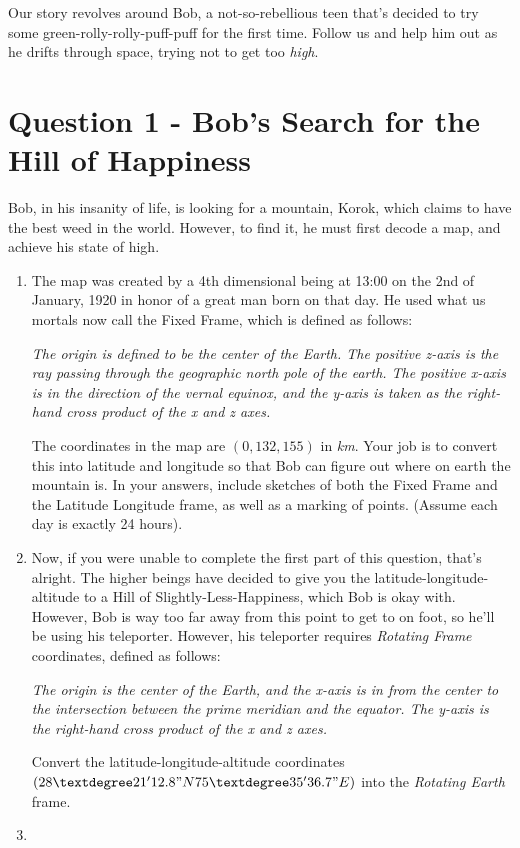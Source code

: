 \documentclass[a4paper, 12pt]{exam}
\begin{document}
	Our story revolves around Bob, a not-so-rebellious teen that's decided to try some green-rolly-rolly-puff-puff for the first time. Follow us and help him out as he drifts through space, trying not to get too \textit{high}.
	
	\pagebreak
	

	\section*{Question 1 - Bob's Search for the Hill of Happiness}
	Bob, in his insanity of life, is looking for a mountain, Korok, which claims to have the best weed in the world. However, to find it, he must first decode a map, and achieve his state of high.
	
	\begin{enumerate}[label=(\alph*)]
		\item The map was created by a 4th dimensional being at 13:00 on the 2nd of January, 1920 in honor of a great man born on that day. He used what us mortals now call the Fixed Frame, which is defined as follows:
		\begin{center}
			\textit{The origin is defined to be the center of the Earth. The positive z-axis is the ray passing through the geographic north pole of the earth. The positive x-axis is in the direction of the vernal equinox, and the y-axis is taken as the right-hand cross product of the x and z axes.}
		\end{center}
		The coordinates in the map are $(0,132,155)$ in \textit{km}. Your job is to convert this into latitude and longitude so that Bob can figure out where on earth the mountain is. In your answers, include sketches of both the Fixed Frame and the Latitude Longitude frame, as well as a marking of points. (Assume each day is exactly 24 hours).
		
		\item Now, if you were unable to complete the first part of this question, that's alright. The higher beings have decided to give you the latitude-longitude-altitude to a Hill of Slightly-Less-Happiness, which Bob is okay with. However, Bob is way too far away from this point to get to on foot, so he'll be using his teleporter. However, his teleporter requires \textit{Rotating Frame} coordinates, defined as follows:
		\begin{center}
			\textit{The origin is the center of the Earth, and the x-axis is in from the center to the intersection between the prime meridian and the equator. The y-axis is the right-hand cross product of the x and z axes.}
		\end{center}
		Convert the latitude-longitude-altitude coordinates $(28°21'12.8"N 75°35'36.7"E)$ into the \textit{Rotating Earth} frame.
		
		\item 
	\end{enumerate}
	
\end{document}
